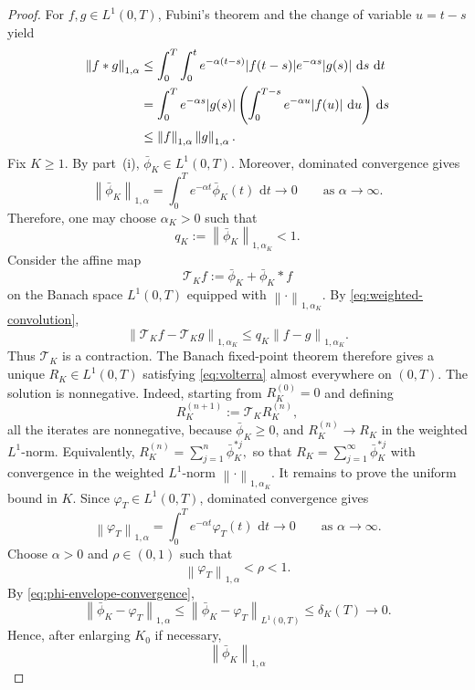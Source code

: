\documentclass[11pt]{article}
\theoremstyle{remarkitalic}
\theoremstyle{remarkitalic}
\newcommand{\dd}{\,\mathrm d}
\newcommand{\1}{\mathbf 1}
\newcommand{\norm}[1]{\left\lVert #1 \right\rVert}
\begin{document}
\begin{proof}
\noindent For $f,g\in L^1(0,T)$, Fubini's theorem and the change of variable
$u=t-s$ yield
\begin{align}
    \norm{f*g}_{1,\alpha}
    &\le
    \int_0^T\int_0^t
    e^{-\alpha(t-s)}|f(t-s)|
    e^{-\alpha s}|g(s)|
    \,\dd s\,\dd t \notag\\
    &=
    \int_0^T
    e^{-\alpha s}|g(s)|
    \left(
        \int_0^{T-s}
        e^{-\alpha u}|f(u)|\,\dd u
    \right)
    \dd s \notag\\
    &\le
    \norm{f}_{1,\alpha}
    \norm{g}_{1,\alpha}.
    \label{eq:weighted-convolution}
\end{align} Fix $K\ge1$. By part~\textup{(i)},
$\bar\phi_K\in L^1(0,T)$. Moreover, dominated convergence gives
\[
    \norm{\bar\phi_K}_{1,\alpha}
    =
    \int_0^T
    e^{-\alpha t}\bar\phi_K(t)\,\dd t
    \longrightarrow 0
    \qquad\text{as }\alpha\to\infty.
\]
Therefore, one may choose $\alpha_K>0$ such that
\[
    q_K
    :=
    \norm{\bar\phi_K}_{1,\alpha_K}
    <1.
\] Consider the affine map
\[
    \mathcal T_K f
    :=
    \bar\phi_K+\bar\phi_K*f
\]
on the Banach space $L^1(0,T)$ equipped with
$\norm{\cdot}_{1,\alpha_K}$. By
\eqref{eq:weighted-convolution},
\[
    \norm{
        \mathcal T_K f-\mathcal T_K g
    }_{1,\alpha_K}
    \le
    q_K
    \norm{f-g}_{1,\alpha_K}.
\]
Thus $\mathcal T_K$ is a contraction. The Banach fixed-point theorem
therefore gives a unique $R_K\in L^1(0,T)$ satisfying
\eqref{eq:volterra} almost everywhere on $(0,T)$. The solution is nonnegative. Indeed, starting from
$R_K^{(0)}=0$ and defining
\[
    R_K^{(n+1)}
    :=
    \mathcal T_K R_K^{(n)},
\]
all the iterates are nonnegative, because $\bar\phi_K\ge0$, and
$R_K^{(n)}\to R_K$ in the weighted $L^1$-norm. Equivalently,
   $ R_K^{(n)}
    =
    \sum_{j=1}^{n}
    \bar\phi_K^{\ast j},$
so that $
    R_K
    =
    \sum_{j=1}^{\infty}
    \bar\phi_K^{\ast j}$
with convergence in the weighted $L^1$-norm
$\norm{\cdot}_{1,\alpha_K}$.  It remains to prove the uniform bound in $K$. Since
$\varphi_T\in L^1(0,T)$, dominated convergence gives
\[
    \norm{\varphi_T}_{1,\alpha}
    =
    \int_0^T
    e^{-\alpha t}\varphi_T(t)\,\dd t
    \longrightarrow 0
    \qquad\text{as }\alpha\to\infty.
\]
Choose $\alpha>0$ and $\rho\in(0,1)$ such that
\[
    \norm{\varphi_T}_{1,\alpha}<\rho<1.
\]
By \eqref{eq:phi-envelope-convergence},
\[
    \norm{
        \bar\phi_K-\varphi_T
    }_{1,\alpha}
    \le
    \norm{
        \bar\phi_K-\varphi_T
    }_{L^1(0,T)}
    \le
    \delta_K(T)
    \longrightarrow0.
\]
Hence, after enlarging $K_0$ if necessary,
\[
    \norm{\bar\phi_K}_{1,\alpha}
\]
\end{proof}
\end{document}
